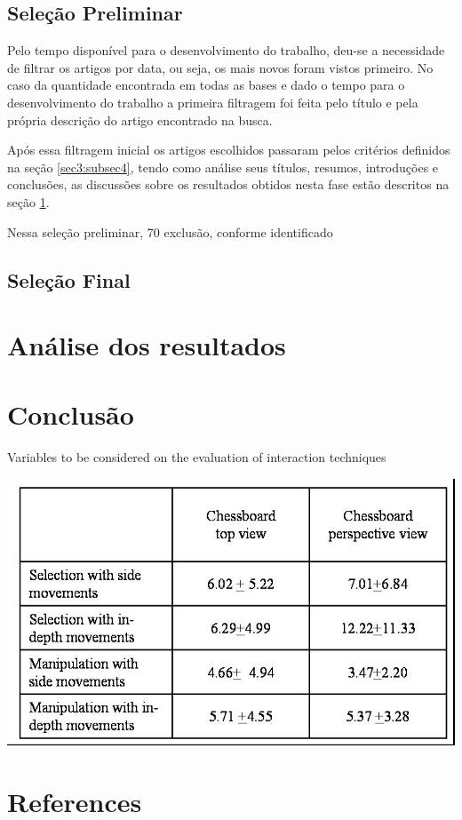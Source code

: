 \documentclass[12pt]{article}
\begin{document}
\subsection{Seleção Preliminar} \label{sec4:subsec2}

Pelo tempo disponível para o desenvolvimento do trabalho, deu-se a necessidade de filtrar os artigos por data, ou seja, os mais novos foram vistos primeiro. No caso da quantidade encontrada em todas as bases e dado o tempo para o desenvolvimento do trabalho a primeira filtragem foi feita pelo título e pela própria descrição do artigo encontrado na busca.

Após essa filtragem inicial os artigos escolhidos passaram pelos critérios definidos na seção \ref{sec3:subsec4}, tendo como análise seus títulos, resumos, introduções e conclusões, as discussões sobre os resultados obtidos nesta fase estão descritos na seção \ref{sec5}.

Nessa  seleção  preliminar,  70%
exclusão, conforme identificado

\subsection{Seleção Final} \label{sec4:subsec3}

\section{Análise dos resultados} \label{sec5}

\section{Conclusão} \label{sec6}

\begin{table}[ht]
\centering
\caption{Variables to be considered on the evaluation of interaction
  techniques}
\label{tab:exTable1}
\includegraphics[width=.7\textwidth]{table.jpg}
\end{table}

\section{References}


\end{document}
